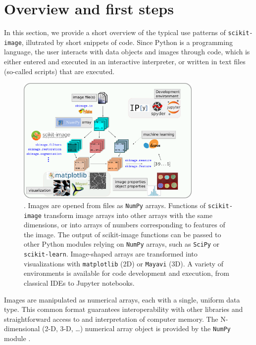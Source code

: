 \documentclass[twocolumn]{bmcart}%
\begin{document}
\section*{Overview and first steps}

In this section, we provide a short overview of the typical use patterns of
\texttt{scikit-image}, illutrated by short snippets of code. Since
Python is a programming language, the user interacts with data objects and
images through code, which is either entered and executed in an interactive
interpreter, or written in text files (so-called scripts) that are executed. 

\begin{figure}
    \centerline{\includegraphics[width=0.8\textwidth]{ecosystem_landscape}}
    \caption{. Images are opened from files as \texttt{NumPy}
	arrays. Functions of \texttt{scikit-image} transform image arrays
	into other arrays with the same dimensions, or into arrays of
	numbers corresponding to features of the image. The output of
	scikit-image functions can be passed to other Python modules
	relying on \texttt{NumPy} arrays, such as \texttt{SciPy} or
	\texttt{scikit-learn}. Image-shaped arrays are transformed into
	visualizations with \texttt{matplotlib} (2D) or \texttt{Mayavi}
	(3D). A variety of environments is available for code development
	and execution, from classical IDEs to Jupyter notebooks.
    \label{fig:ecosystem}}
\end{figure}


Images are manipulated as numerical arrays, each with a single, uniform
data type.  This common format guarantees interoperability with other
libraries and straightforward access to and interpretation of computer memory. The
N-dimensional (2-D, 3-D, \dots) numerical array object is provided by the
\texttt{NumPy} module \citep{Vanderwalt2011}.
\end{document}
